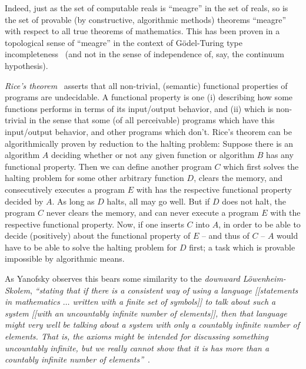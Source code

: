 Indeed, just as the set of computable reals is ``meagre'' in the set of reals,
so is the set of provable (by constructive, algorithmic methods)
theorems ``meagre'' with respect to all true theorems of mathematics.
This has been proven in a topological sense of ``meagre'' in the context of G\"odel-Turing type incompleteness~\cite{calude:94b}
(and not in the sense of independence of, say, the continuum hypothesis).

{\em Rice's theorem}~\cite{Rice-1953}
asserts that all non-trivial, (semantic) functional properties of programs are undecidable.
A functional property
is one  (i) describing how some functions performs in terms of its input/output behavior, and
(ii) which is non-trivial in the sense that some (of all perceivable) programs which have this input/output behavior,
and other programs which don't.
Rice's theorem can be algorithmically proven by reduction to the halting problem:
Suppose there is an algorithm $A$ deciding whether or not any given function
or algorithm $B$ has any functional property.
Then we can define another program $C$ which first solves the halting problem for some other arbitrary function $D$,
clears the memory, and consecutively executes a program $E$ with has the respective functional property decided by $A$.
As long as  $D$ halts, all may go well.
But if $D$ does not halt, the program $C$ never clears the memory,
and can never execute a program $E$ with the respective functional property.
Now, if one inserts $C$ into $A$,
in order to be able to decide (positively) about the functional property of $E$ -- and thus of $C$ --
$A$ would have to be able to solve the halting problem for $D$ first;
a task which is provable impossible by algorithmic means.



As Yanofsky observes this bears some similarity to the
{\em downward L\"owenheim-Skolem},
{\em ``stating that if there is a
consistent way of using a language [[statements in mathematics $\ldots$ written with a
finite set of symbols]] to talk about such a system [[with an uncountably infinite number
of elements]], then that language
might very well be talking about a system with only a countably infinite number
of elements. That is, the axioms might be intended for discussing something
uncountably infinite, but we really cannot show that it is has more than a countably
infinite number of elements''}~\cite[footnote~20, p.~375]{Yanofsky-ol}.




